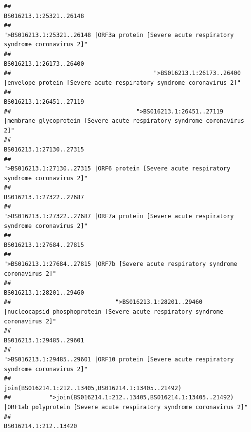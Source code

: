 \documentclass[
]{article}
\begin{document}
\begin{verbatim}
##                                                                                                                BS016213.1:25321..26148 
##                                            ">BS016213.1:25321..26148 |ORF3a protein [Severe acute respiratory syndrome coronavirus 2]" 
##                                                                                                                BS016213.1:26173..26400 
##                                         ">BS016213.1:26173..26400 |envelope protein [Severe acute respiratory syndrome coronavirus 2]" 
##                                                                                                                BS016213.1:26451..27119 
##                                    ">BS016213.1:26451..27119 |membrane glycoprotein [Severe acute respiratory syndrome coronavirus 2]" 
##                                                                                                                BS016213.1:27130..27315 
##                                             ">BS016213.1:27130..27315 |ORF6 protein [Severe acute respiratory syndrome coronavirus 2]" 
##                                                                                                                BS016213.1:27322..27687 
##                                            ">BS016213.1:27322..27687 |ORF7a protein [Severe acute respiratory syndrome coronavirus 2]" 
##                                                                                                                BS016213.1:27684..27815 
##                                                    ">BS016213.1:27684..27815 |ORF7b [Severe acute respiratory syndrome coronavirus 2]" 
##                                                                                                                BS016213.1:28201..29460 
##                              ">BS016213.1:28201..29460 |nucleocapsid phosphoprotein [Severe acute respiratory syndrome coronavirus 2]" 
##                                                                                                                BS016213.1:29485..29601 
##                                            ">BS016213.1:29485..29601 |ORF10 protein [Severe acute respiratory syndrome coronavirus 2]" 
##                                                                                    join(BS016214.1:212..13405,BS016214.1:13405..21492) 
##           ">join(BS016214.1:212..13405,BS016214.1:13405..21492) |ORF1ab polyprotein [Severe acute respiratory syndrome coronavirus 2]" 
##                                                                                                                  BS016214.1:212..13420 

\end{verbatim}
\end{document}
